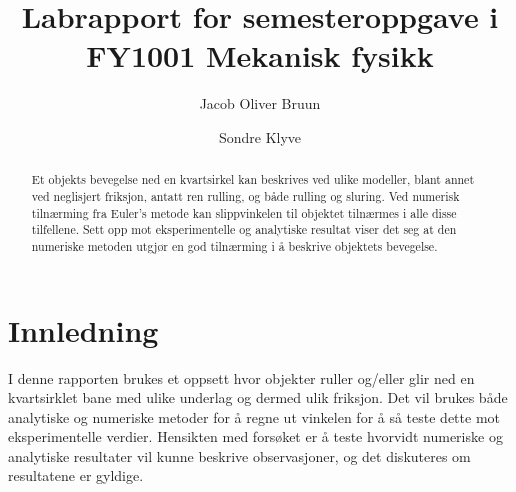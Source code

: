 \documentclass[5p]{elsarticle}
\title{Labrapport for semesteroppgave i FY1001 Mekanisk fysikk}
\author[fysikk]{Jacob Oliver Bruun}
\author[fysikk]{Sondre Klyve}
\begin{document}
	
	\begin{abstract}
		Et objekts bevegelse ned en kvartsirkel kan beskrives ved ulike modeller, blant annet ved neglisjert friksjon, antatt ren rulling, og både rulling og sluring. Ved numerisk tilnærming fra Euler's metode kan slippvinkelen til objektet tilnærmes i alle disse tilfellene. Sett opp mot eksperimentelle og analytiske resultat viser det seg at den numeriske metoden utgjør en god tilnærming i å beskrive objektets bevegelse.
		
	\end{abstract}
	
	\maketitle %
	
	\section{Innledning}
	
	I denne rapporten brukes et oppsett hvor objekter ruller og/eller glir ned en kvartsirklet bane med ulike underlag og dermed ulik friksjon. Det vil brukes både analytiske og numeriske metoder for å regne ut vinkelen for å så teste dette mot eksperimentelle verdier. Hensikten med forsøket er å teste hvorvidt numeriske og analytiske resultater vil kunne beskrive observasjoner, og det diskuteres om resultatene er gyldige.
	
\end{document}
